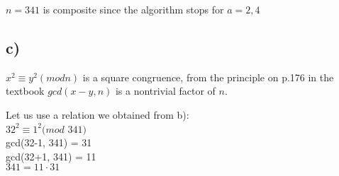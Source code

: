 \documentclass{article}
\begin{document}
$n=341$ is composite since the algorithm stops for $a=2,4$

\subsection*{c)}

$x^{2} \equiv y^{2} (mod n)$ is a square congruence, from the principle on p.176 in the textbook $gcd(x-y,n)$ is a nontrivial factor of $n$.

Let us use a relation we obtained from b):\\
$32^{2} \equiv 1^{2} (mod$ $341)$\\
gcd(32-1, 341) = 31\\
gcd(32+1, 341) = 11\\
$341 = 11 \cdotp 31$
\end{document}
